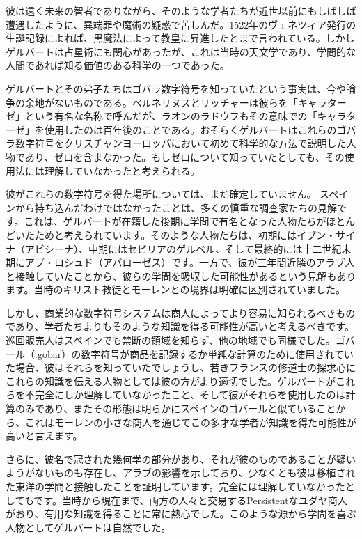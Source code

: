 \documentclass[a4paper,11pt,openany]{ltjsbook}
\begin{document}
彼は遠く未来の智者でありながら、そのような学者たちが近世以前にもしばしば遭遇したように、異端罪や魔術の疑惑で苦しんだ。1522年のヴェネツィア発行の生誕記録によれば、黒魔法によって教皇に昇進したとまで言われている。しかしゲルバートは占星術にも関心があったが、これは当時の天文学であり、学問的な人間であれば知る価値のある科学の一つであった。

ゲルバートとその弟子たちはゴバラ数字符号を知っていたという事実は、今や論争の余地がないものである。ベルネリヌスとリッチャーは彼らを「キャラターゼ」という有名な名称で呼んだが、ラオンのラドウフもその意味での「キャラターゼ」を使用したのは百年後のことである。おそらくゲルバートはこれらのゴバラ数字符号をクリスチャンヨーロッパにおいて初めて科学的な方法で説明した人物であり、ゼロを含まなかった。もしゼロについて知っていたとしても、その使用法には理解していなかったと考えられる。

彼がこれらの数字符号を得た場所については、まだ確定していません。
スペインから持ち込んだわけではなかったことは、多くの慎重な調査家たちの見解です。これは、ゲルバートが在籍した後期に学問で有名となった人物たちがほとんどいたためと考えられています。そのような人物たちは、初期にはイブン・サイナ（アビシーナ）、中期にはセビリアのゲルベル、そして最終的には十二世紀末期にアブ・ロシュド（アバローゼス）です。一方で、彼が三年間近隣のアラブ人と接触していたことから、彼らの学問を吸収した可能性があるという見解もあります。当時のキリスト教徒とモーレンとの境界は明確に区別されていました。

しかし、商業的な数字符号システムは商人によってより容易に知られるべきものであり、学者たちよりもそのような知識を得る可能性が高いと考えるべきです。巡回販売人はスペインでも禁断の領域を知らず、他の地域でも同様でした。ゴバール（.gobār）の数字符号が商品を記録するか単純な計算のために使用されていた場合、彼はそれらを知っていたでしょうし、若きフランスの修道士の探求心にこれらの知識を伝える人物としては彼の方がより適切でした。ゲルバートがこれらを不完全にしか理解していなかったこと、そして彼がそれらを使用したのは計算のみであり、またその形態は明らかにスペインのゴバールと似ていることから、これはモーレンの小さな商人を通じてこの多才な学者が知識を得た可能性が高いと言えます。

さらに、彼名で冠された幾何学の部分があり、それが彼のものであることが疑いようがないものも存在し、アラブの影響を示しており、少なくとも彼は移植された東洋の学問と接触したことを証明しています。完全には理解していなかったとしてもです。当時から現在まで、両方の人々と交易するPersistentなユダヤ商人がおり、有用な知識を得ることに常に熱心でした。このような源から学問を喜ぶ人物としてゲルバートは自然でした。
\end{document}
